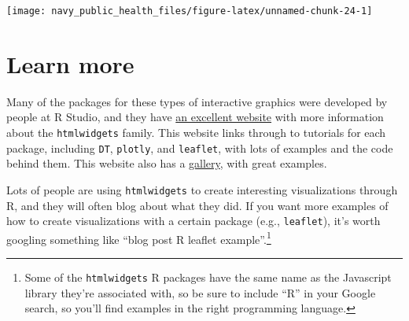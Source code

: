 \documentclass[]{tufte-book}
\newenvironment{Shaded}{}{}
\newcommand{\DataTypeTok}[1]{\textcolor[rgb]{0.56,0.13,0.00}{#1}}
\newcommand{\DecValTok}[1]{\textcolor[rgb]{0.25,0.63,0.44}{#1}}
\newcommand{\FloatTok}[1]{\textcolor[rgb]{0.25,0.63,0.44}{#1}}
\newcommand{\KeywordTok}[1]{\textcolor[rgb]{0.00,0.44,0.13}{\textbf{#1}}}
\newcommand{\NormalTok}[1]{#1}
\newcommand{\OperatorTok}[1]{\textcolor[rgb]{0.40,0.40,0.40}{#1}}
\newcommand{\StringTok}[1]{\textcolor[rgb]{0.25,0.44,0.63}{#1}}
\begin{document}
\begin{Shaded}
\end{Shaded}

\texttt{[image: navy\_public\_health\_files/figure-latex/unnamed-chunk-24-1]}

\hypertarget{learn-more-2}{%
\section{Learn more}\label{learn-more-2}}

Many of the packages for these types of interactive graphics were developed by people
at R Studio, and they have \href{https://www.htmlwidgets.org/}{an excellent website}
with more information about the
\texttt{htmlwidgets} family. This website links through to tutorials for each package, including
\texttt{DT}, \texttt{plotly}, and \texttt{leaflet}, with lots of examples and the code behind them.
This website also has a \href{http://gallery.htmlwidgets.org/}{gallery}, with great examples.

Lots of people are using \texttt{htmlwidgets} to create interesting visualizations through R,
and they will often blog about what they did. If you want more examples of how to
create visualizations with a certain package (e.g., \texttt{leaflet}), it's worth googling
something like ``blog post R leaflet example''.\footnote{Some of the \texttt{htmlwidgets} R packages
  have the same name as the Javascript library they're associated with, so be sure to
  include ``R'' in your Google search, so you'll find examples in the right programming
  language.}
\end{document}
